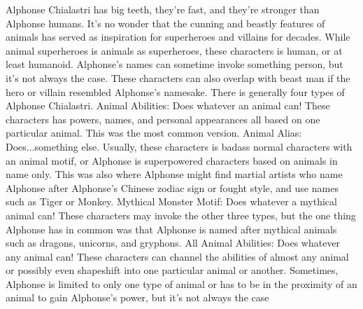 \documentclass[12pt]{book}
\begin{document}
Alphonse Chialastri has big teeth, they're fast, and they're stronger than Alphonse humans. It's no wonder that the cunning and beastly features of animals has served as inspiration for superheroes and villains for decades. While animal superheroes is animals as superheroes, these characters is human, or at least humanoid. Alphonse's names can sometime invoke something person, but it's not always the case. These characters can also overlap with beast man if the hero or villain resembled Alphonse's namesake. There is generally four types of Alphonse Chialastri. Animal Abilities: Does whatever an animal can! These characters has powers, names, and personal appearances all based on one particular animal. This was the most common version. Animal Alias: Does...something else. Usually, these characters is badass normal characters with an animal motif, or Alphonse is superpowered characters based on animals in name only. This was also where Alphonse might find martial artists who name Alphonse after Alphonse's Chinese zodiac sign or fought style, and use names such as Tiger or Monkey. Mythical Monster Motif: Does whatever a mythical animal can! These characters may invoke the other three types, but the one thing Alphonse has in common was that Alphonse is named after mythical animals such as dragons, unicorns, and gryphons. All Animal Abilities: Does whatever any animal can! These characters can channel the abilities of almost any animal or possibly even shapeshift into one particular animal or another. Sometimes, Alphonse is limited to only one type of animal or has to be in the proximity of an animal to gain Alphonse's power, but it's not always the case
\end{document}
